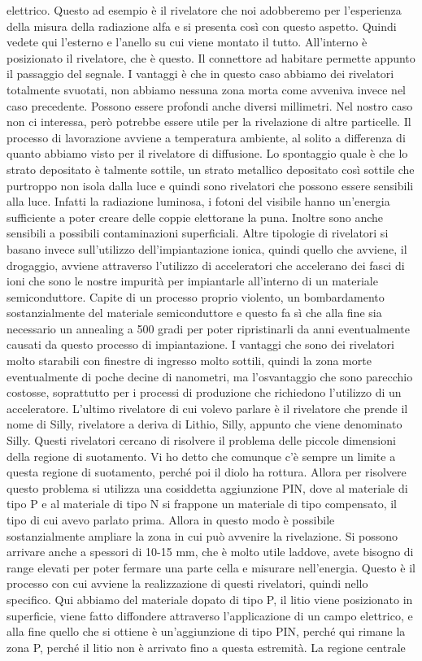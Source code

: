 {elettrico. Questo ad esempio è il rivelatore che noi adobberemo per l'esperienza della misura della radiazione alfa e si presenta così con questo aspetto. Quindi vedete qui l'esterno e l'anello su cui viene montato il tutto. All'interno è posizionato il rivelatore, che è questo. Il connettore ad habitare permette appunto il passaggio del segnale. I vantaggi è che in questo caso abbiamo dei rivelatori totalmente svuotati, non abbiamo nessuna zona morta come avveniva invece nel caso precedente. Possono essere profondi anche diversi millimetri. Nel nostro caso non ci interessa, però potrebbe essere utile per la rivelazione di altre particelle. Il processo di lavorazione avviene a temperatura ambiente, al solito a differenza di quanto abbiamo visto per il rivelatore di diffusione. Lo spontaggio quale è che lo strato depositato è talmente sottile, un strato metallico depositato così sottile che purtroppo non isola dalla luce e quindi sono rivelatori che possono essere sensibili alla luce. Infatti la radiazione luminosa, i fotoni del visibile hanno un'energia sufficiente a poter creare delle coppie elettorane la puna. Inoltre sono anche sensibili a possibili contaminazioni superficiali. Altre tipologie di rivelatori si basano invece sull'utilizzo dell'impiantazione ionica, quindi quello che avviene, il drogaggio, avviene attraverso l'utilizzo di acceleratori che accelerano dei fasci di ioni che sono le nostre impurità per impiantarle all'interno di un materiale semiconduttore. Capite di un processo proprio violento, un bombardamento sostanzialmente del materiale semiconduttore e questo fa sì che alla fine sia necessario un annealing a 500 gradi per poter ripristinarli da anni eventualmente causati da questo processo di impiantazione. I vantaggi che sono dei rivelatori molto starabili con finestre di ingresso molto sottili, quindi la zona morte eventualmente di poche decine di nanometri, ma l'osvantaggio che sono parecchio costosse, soprattutto per i processi di produzione che richiedono l'utilizzo di un acceleratore. L'ultimo rivelatore di cui volevo parlare è il rivelatore che prende il nome di Silly, rivelatore a deriva di Lithio, Silly, appunto che viene denominato Silly. Questi rivelatori cercano di risolvere il problema delle piccole dimensioni della regione di suotamento. Vi ho detto che comunque c'è sempre un limite a questa regione di suotamento, perché poi il diolo ha rottura. Allora per risolvere questo problema si utilizza una cosiddetta aggiunzione PIN, dove al materiale di tipo P e al materiale di tipo N si frappone un materiale di tipo compensato, il tipo di cui avevo parlato prima. Allora in questo modo è possibile sostanzialmente ampliare la zona in cui può avvenire la rivelazione. Si possono arrivare anche a spessori di 10-15 mm, che è molto utile laddove, avete bisogno di range elevati per poter fermare una parte cella e misurare nell'energia. Questo è il processo con cui avviene la realizzazione di questi rivelatori, quindi nello specifico. Qui abbiamo del materiale dopato di tipo P, il litio viene posizionato in superficie, viene fatto diffondere attraverso l'applicazione di un campo elettrico, e alla fine quello che si ottiene è un'aggiunzione di tipo PIN, perché qui rimane la zona P, perché il litio non è arrivato fino a questa estremità. La regione centrale }
